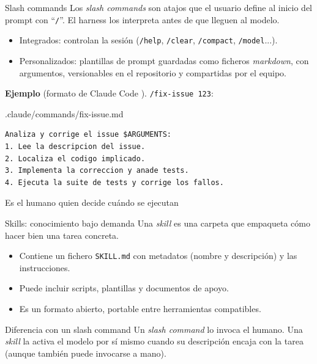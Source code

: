 \begin{frame}[fragile]{Slash commands}
Los \alert{\textit{slash commands}} son atajos que el \alert{usuario} define al inicio del prompt con ``\texttt{/}''. El harness los \alert{interpreta} antes de que lleguen al modelo.
 
\begin{itemize}
    \item \alert{Integrados:} controlan la sesión (\texttt{/help}, \texttt{/clear}, \texttt{/compact}, \texttt{/model}...).
    \item \alert{Personalizados:} \alert{plantillas de prompt} guardadas como ficheros \textit{markdown}, con argumentos, \alert{versionables} en el repositorio y compartidas por el equipo.
\end{itemize}
 
\textbf{Ejemplo} (formato de Claude Code \cite{claudecodedocs}). \texttt{/fix-issue 123}:
\begin{block}{.claude/commands/fix-issue.md}
\scriptsize
\begin{verbatim}
Analiza y corrige el issue $ARGUMENTS:
1. Lee la descripcion del issue.
2. Localiza el codigo implicado.
3. Implementa la correccion y anade tests.
4. Ejecuta la suite de tests y corrige los fallos.
\end{verbatim}
\end{block}
 
\alert{Es el humano quien decide cuándo se ejecutan}
\end{frame}
 
\begin{frame}{Skills: conocimiento bajo demanda}
Una \alert{\textit{skill}} es una \alert{carpeta} que empaqueta cómo hacer bien una tarea concreta.
 
\begin{itemize}
    \item Contiene un fichero \texttt{SKILL.md} con \alert{metadatos} (nombre y \alert{descripción}) y las instrucciones.
    \item Puede incluir \alert{scripts, plantillas y documentos} de apoyo.
    \item Es un \alert{formato abierto}, portable entre herramientas compatibles.
\end{itemize}
 
\begin{alertblock}{Diferencia con un slash command}
\vspace{0.25cm}
Un \textit{slash command} lo invoca el \alert{humano}. Una \textit{skill} la \alert{activa el modelo} por sí mismo cuando su \alert{descripción} encaja con la tarea (aunque también puede invocarse a mano).
\end{alertblock}
\end{frame}
 
